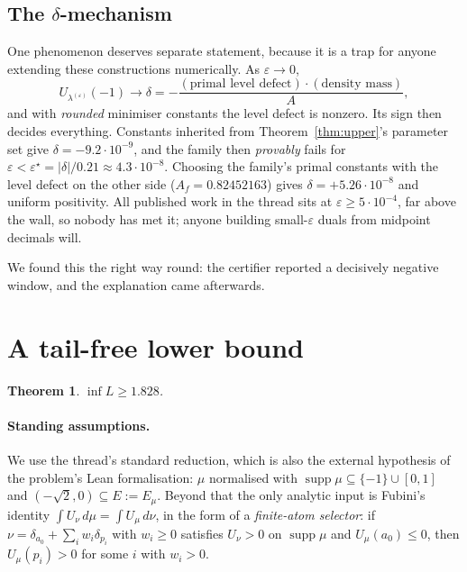 \documentclass[11pt]{article}
\newtheorem{theorem}{Theorem}
\newcommand{\supp}{\operatorname{supp}}
\begin{document}
\subsection{The $\delta$-mechanism}

One phenomenon deserves separate statement, because it is a trap for
anyone extending these constructions numerically. As
$\varepsilon\to0$,
\[
  U_{\lambda^{(\varepsilon)}}(-1)\longrightarrow
  \delta = -\frac{(\text{primal level defect})\cdot(\text{density mass})}{A},
\]
and with \emph{rounded} minimiser constants the level defect is nonzero.
Its sign then decides everything. Constants inherited from
Theorem~\ref{thm:upper}'s parameter set give $\delta=-9.2\cdot10^{-9}$,
and the family then \emph{provably} fails for
$\varepsilon<\varepsilon^\star=\lvert\delta\rvert/0.21\approx
4.3\cdot10^{-8}$. Choosing the family's primal constants with the level
defect on the other side ($A_f=0.82452163$) gives
$\delta=+5.26\cdot10^{-8}$ and uniform positivity. All published work in
the thread sits at $\varepsilon\ge5\cdot10^{-4}$, far above the wall,
so nobody has met it; anyone building small-$\varepsilon$ duals from
midpoint decimals will.

We found this the right way round: the certifier reported a decisively
negative window, and the explanation came afterwards.

\section{A tail-free lower bound}\label{sec:lower}

\begin{theorem}\label{thm:lower}
$\inf L \ge 1.828$.
\end{theorem}

\paragraph{Standing assumptions.} We use the thread's standard
reduction, which is also the external hypothesis of the problem's Lean
formalisation: $\mu$ normalised with $\supp\mu\subseteq\{-1\}\cup[0,1]$
and $(-\sqrt2,0)\subseteq E:=E_\mu$. Beyond that the only analytic input
is Fubini's identity $\int U_\nu\,d\mu=\int U_\mu\,d\nu$, in the form of
a \emph{finite-atom selector}: if $\nu=\delta_{a_0}+\sum_i w_i
\delta_{p_i}$ with $w_i\ge0$ satisfies $U_\nu>0$ on $\supp\mu$ and
$U_\mu(a_0)\le0$, then $U_\mu(p_i)>0$ for some $i$ with $w_i>0$.
\end{document}
